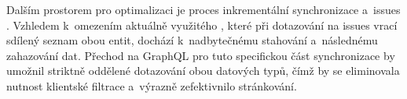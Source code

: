 Dalším prostorem pro optimalizaci je proces inkrementální synchronizace \PR a~issues . Vzhledem k~omezením aktuálně využitého \REST \API, které při dotazování na issues vrací sdílený seznam obou entit, dochází k~nadbytečnému stahování a~následnému zahazování dat. Přechod na GraphQL \API pro tuto specifickou část synchronizace by umožnil striktně oddělené dotazování obou datových typů, čímž by se eliminovala nutnost klientské filtrace a~výrazně zefektivnilo stránkování.

\endinput